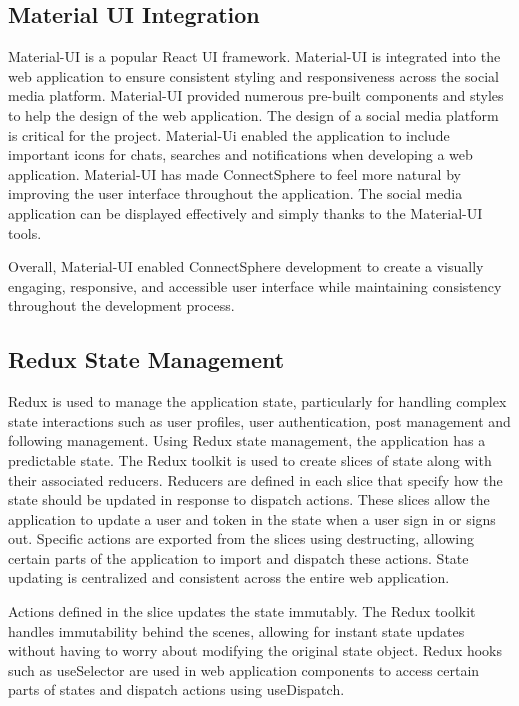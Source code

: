 \subsection{Material UI Integration}
Material-UI is a popular React UI framework. Material-UI is integrated into the web application to ensure consistent styling and responsiveness across the social media platform. Material-UI provided numerous pre-built components and styles to help the design of the web application. The design of a social media platform is critical for the project. Material-Ui enabled the application to include important icons for chats, searches and notifications when developing a web application. Material-UI has made ConnectSphere to feel more natural by improving the user interface throughout the application. The social media application can be displayed effectively and simply thanks to the Material-UI tools.

Overall, Material-UI enabled ConnectSphere development to create a visually engaging, responsive, and accessible user interface while maintaining consistency throughout the development process.

\subsection{Redux State Management}
Redux is used to manage the application state, particularly for handling complex state interactions such as user profiles, user authentication, post management and following management. Using Redux state management, the application has a predictable state. The Redux toolkit is used to create slices of state along with their associated reducers. Reducers are defined in each slice that specify how the state should be updated in response to dispatch actions. These slices allow the application to update a user and token in the state when a user sign in or signs out. Specific actions are exported from the slices using destructing, allowing certain parts of the application to import and dispatch these actions. State updating is centralized and consistent across the entire web application.

Actions defined in the slice updates the state immutably. The Redux toolkit handles immutability behind the scenes, allowing for instant state updates without having to worry about modifying the original state object. Redux hooks such as useSelector are used in web application components to access certain parts of states and dispatch actions using useDispatch.

